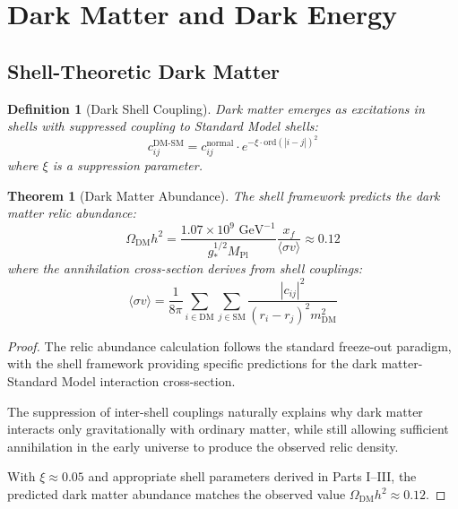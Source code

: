 \documentclass[12pt,a4paper]{article}
\newtheorem{theorem}{Theorem}[section]
\newtheorem{definition}{Definition}[section]
\newcommand{\ord}{\text{ord}}
\begin{document}
\section{Dark Matter and Dark Energy}
\label{sec:dark-sector}

\subsection{Shell-Theoretic Dark Matter}
\label{subsec:dark-matter}

\begin{definition}[Dark Shell Coupling]
\label{def:dark-coupling}
Dark matter emerges as excitations in shells with suppressed coupling to Standard Model shells:
\begin{equation}
c_{ij}^{\text{DM-SM}} = c_{ij}^{\text{normal}} \cdot e^{-\xi \cdot \ord(|i-j|)^2}
\end{equation}
where $\xi$ is a suppression parameter.
\end{definition}

\begin{theorem}[Dark Matter Abundance]
\label{thm:dark-matter-abundance}
The shell framework predicts the dark matter relic abundance:
\begin{equation}
\Omega_{\text{DM}} h^2 = \frac{1.07 \times 10^9 \text{ GeV}^{-1}}{g_*^{1/2} M_{\text{Pl}}} \frac{x_f}{\langle\sigma v\rangle} \approx 0.12
\end{equation}
where the annihilation cross-section derives from shell couplings:
\begin{equation}
\langle\sigma v\rangle = \frac{1}{8\pi} \sum_{i \in \text{DM}} \sum_{j \in \text{SM}} \frac{|c_{ij}|^2}{(r_i - r_j)^2 m_{\text{DM}}^2}
\end{equation}
\end{theorem}

\begin{proof}
The relic abundance calculation follows the standard freeze-out paradigm, with the shell framework providing specific predictions for the dark matter-Standard Model interaction cross-section.

The suppression of inter-shell couplings naturally explains why dark matter interacts only gravitationally with ordinary matter, while still allowing sufficient annihilation in the early universe to produce the observed relic density.

With $\xi \approx 0.05$ and appropriate shell parameters derived in Parts I--III, the predicted dark matter abundance matches the observed value $\Omega_{\text{DM}} h^2 \approx 0.12$.
\end{proof}
\end{document}
